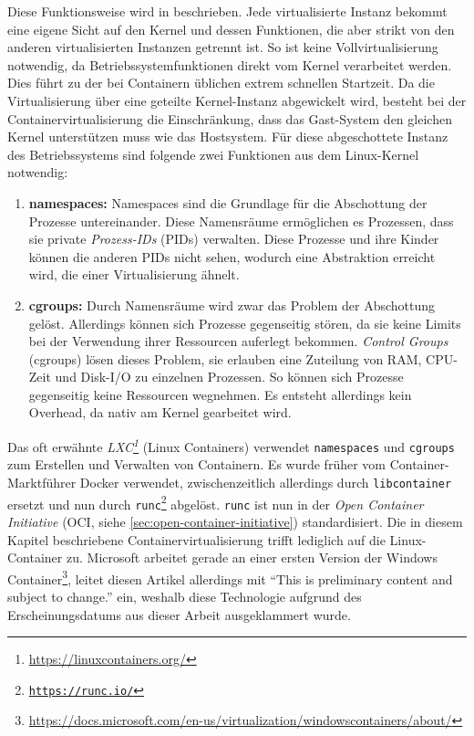 Diese Funktionsweise wird in \autocite{Diedrich2016} beschrieben.
Jede virtualisierte Instanz bekommt eine eigene Sicht auf den Kernel und dessen Funktionen, die aber strikt von den anderen virtualisierten Instanzen getrennt ist.
So ist keine Vollvirtualisierung notwendig, da Betriebssystemfunktionen direkt vom Kernel verarbeitet werden.
Dies führt zu der bei Containern üblichen extrem schnellen Startzeit.
Da die Virtualisierung über eine geteilte Kernel-Instanz abgewickelt wird, besteht bei der Containervirtualisierung die Einschränkung, dass das Gast-System den gleichen Kernel unterstützen muss wie das Hostsystem.
Für diese abgeschottete Instanz des Betriebssystems sind folgende zwei Funktionen aus dem Linux-Kernel notwendig:
\begin{enumerate}
    \item \textbf{namespaces:} Namespaces sind die Grundlage für die Abschottung der Prozesse untereinander. Diese Namensräume ermöglichen es Prozessen, dass sie private \emph{Prozess-IDs} (PIDs) verwalten. Diese Prozesse und ihre Kinder können die anderen PIDs nicht sehen, wodurch eine Abstraktion erreicht wird, die einer Virtualisierung ähnelt.
    \item \textbf{cgroups:} Durch Namensräume wird zwar das Problem der Abschottung gelöst. Allerdings können sich Prozesse gegenseitig stören, da sie keine Limits bei der Verwendung ihrer Ressourcen auferlegt bekommen. \emph{Control Groups} (cgroups) lösen dieses Problem, sie erlauben eine Zuteilung von RAM, CPU-Zeit und Disk-I/O zu einzelnen Prozessen. So können sich Prozesse gegenseitig keine Ressourcen wegnehmen. Es entsteht allerdings kein Overhead, da nativ am Kernel gearbeitet wird.
\end{enumerate}
Das oft erwähnte \emph{LXC\footnote{\url{https://linuxcontainers.org/}}} (Linux Containers) \autocite{rkt-comparison:online} verwendet \texttt{namespaces} und \texttt{cgroups} zum Erstellen und Verwalten von Containern. Es wurde früher vom Container-Marktführer Docker verwendet, zwischenzeitlich allerdings durch \texttt{libcontainer} ersetzt und nun durch \texttt{runc\footnote{\url{https://runc.io/}}} abgelöst.
\texttt{runc} ist nun in der \emph{Open Container Initiative} (OCI, siehe \cref{sec:open-container-initiative}) standardisiert.
Die in diesem Kapitel beschriebene Containervirtualisierung trifft lediglich auf die Linux-Container zu. Microsoft arbeitet gerade an einer ersten Version der Windows Container\footnote{\url{https://docs.microsoft.com/en-us/virtualization/windowscontainers/about/}}, leitet diesen Artikel allerdings mit "`This is preliminary content and subject to change."' ein, weshalb diese Technologie aufgrund des Erscheinungsdatums aus dieser Arbeit ausgeklammert wurde.

